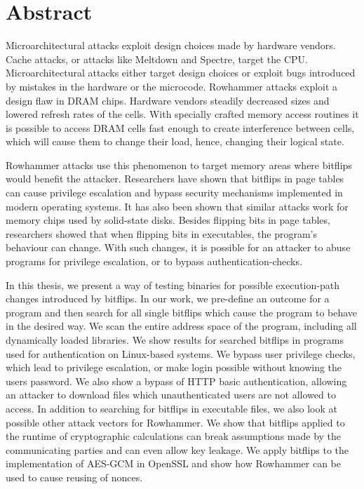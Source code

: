 
{}
\chapter*{Abstract}
\label{cha:abstract}

Microarchitectural attacks exploit design choices made by hardware vendors.
Cache attacks, or attacks like Meltdown and Spectre, target the CPU.
Microarchitectural attacks either target design choices or exploit bugs
introduced by mistakes in the hardware or the microcode. Rowhammer attacks
exploit a design flaw in DRAM chips. Hardware vendors steadily decreased sizes
and lowered refresh rates of the cells. With specially crafted memory access
routines it is possible to access DRAM cells fast enough to create interference
between cells, which will cause them to change their load, hence, changing their
logical state.

Rowhammer attacks use this phenomenon to target memory areas where bitflips
would benefit the attacker. Researchers have shown that bitflips in page tables
can cause privilege escalation and bypass security mechanisms implemented in
modern operating systems. It has also been shown that similar attacks work for
memory chips used by solid-state disks. Besides flipping bits in page tables,
researchers showed that when flipping bits in executables, the program's
behaviour can change. With such changes, it is possible for an attacker to abuse
programs for privilege escalation, or to bypass authentication-checks.

In this thesis, we present a way of testing binaries for possible execution-path
changes introduced by bitflips. In our work, we pre-define an outcome for a
program and then search for all single bitflips which cause the program to
behave in the desired way. We scan the entire address space of the program,
including all dynamically loaded libraries. We show results for searched
bitflips in programs used for authentication on Linux-based systems. We bypass
user privilege checks, which lead to privilege escalation, or make login
possible without knowing the user\textquotesingle s password. We also show a
bypass of HTTP basic authentication, allowing an attacker to download files
which unauthenticated users are not allowed to access. In addition to searching
for bitflips in executable files, we also look at possible other attack vectors
for Rowhammer. We show that bitflips applied to the runtime of cryptographic
calculations can break assumptions made by the communicating parties and can
even allow key leakage. We apply bitflips to the implementation of AES-GCM in
OpenSSL and show how Rowhammer can be used to cause reusing of nonces.

